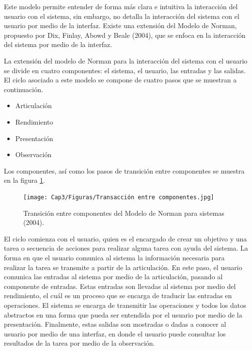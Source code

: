 Este modelo permite entender de forma más clara e intuitiva la interacción del usuario con el sistema, sin embargo, no detalla la interacción del sistema con el usuario por medio de la interfaz. Existe una extensión del Modelo de Norman, propuesto por Dix, Finlay, Abowd y Beale (2004), que se enfoca en la interacción del sistema por medio de la interfaz. 

La extensión del modelo de Norman para la interacción del sistema con el usuario se divide en cuatro componentes: el sistema, el usuario, las entradas y las salidas. El ciclo asociado a este modelo se compone de cuatro pasos que se muestran a continuación.

\begin{itemize}
  \item Articulación
  \item Rendimiento
  \item Presentación
  \item Observación
\end{itemize}

Los componentes, así como los pasos de transición entre componentes se muestra en la figura \ref{fig:31}.

\begin{figure}[H]
  \centering
  \texttt{[image: Cap3/Figuras/Transacción entre componentes.jpg]}
  \caption{Transición entre componentes del Modelo de Norman para sistemas (2004).}
  \label{fig:31}
\end{figure}

El ciclo comienza con el usuario, quien es el encargado de crear un objetivo y una tarea o secuencia de acciones para realizar alguna tarea con ayuda del sistema. La forma en que el usuario comunica al sistema la información necesaria para realizar la tarea se transmite a partir de la articulación. En este paso, el usuario comunica las entradas al sistema por medio de la articulación, pasando al componente de entradas. Estas entradas son llevadas al sistema por medio del rendimiento, el cuál es un proceso que se encarga de traducir las entradas en operaciones. El sistema se encarga de transmitir las operaciones y todos los datos abstractos en una forma que pueda ser entendida por el usuario por medio de la presentación. Finalmente, estas salidas son mostradas o dadas a conocer al usuario por medio de una interfaz, en donde el usuario puede consultar los resultados de la tarea por medio de la observación.

